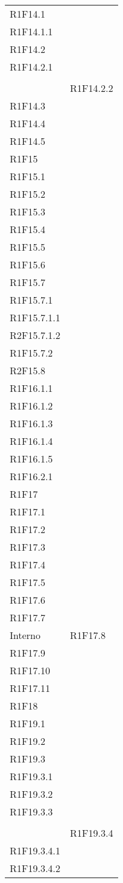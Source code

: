 \begin{longtable}{ >{\centering}p{}
			>{\centering}p{}}
		R1F14.1\\
		R1F14.1.1\\
		R1F14.2\\
		R1F14.2.1
			\tabularnewline \rowcolordark
		&
			\tabularnewline 
		&
		R1F14.2.2\\
		R1F14.3\\
		R1F14.4\\
		R1F14.5\\
		R1F15\\
		R1F15.1\\
		R1F15.2\\
		R1F15.3\\
		R1F15.4\\
		R1F15.5\\
		R1F15.6\\
		R1F15.7\\
		R1F15.7.1\\
		R1F15.7.1.1\\
		R2F15.7.1.2\\
		R1F15.7.2\\
		R2F15.8\\
		R1F16.1.1\\
		R1F16.1.2\\
		R1F16.1.3\\
		R1F16.1.4\\
		R1F16.1.5\\
		R1F16.2.1\\
		R1F17\\
		R1F17.1\\
		R1F17.2\\
		R1F17.3\\
		R1F17.4\\
		R1F17.5\\
		R1F17.6\\
		R1F17.7 \tabularnewline
		Interno	&
		R1F17.8\\
		R1F17.9\\
		R1F17.10\\
		R1F17.11\\
		R1F18\\
		R1F19.1\\
		R1F19.2\\
		R1F19.3\\
		R1F19.3.1\\
		R1F19.3.2\\
		R1F19.3.3
		\tabularnewline \rowcolorlight
		&
		\tabularnewline 
		&
		R1F19.3.4\\
		R1F19.3.4.1\\
		R1F19.3.4.2\\

\end{longtable}

